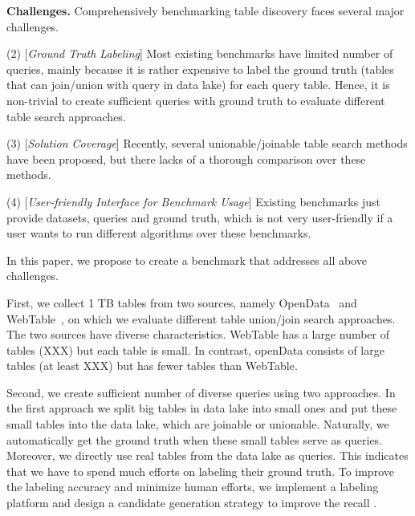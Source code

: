 \noindent \textbf{Challenges.} Comprehensively benchmarking table discovery faces several major challenges.


\noindent (2) [\textit{Ground Truth Labeling}] 
Most existing benchmarks have limited number of queries,  mainly because it is rather expensive to label the ground truth (tables  that can join/union with query in data lake) for each query table. Hence, it is non-trivial to create sufficient queries with ground truth to evaluate different table search approaches.

\noindent (3) [\textit{Solution Coverage}] 
Recently, several unionable/joinable table search methods have been proposed, but there lacks of a thorough comparison over these methods.

\noindent (4) [\textit{User-friendly Interface for Benchmark Usage}] Existing benchmarks just provide datasets, queries and ground truth, which is not very user-friendly if a user wants to
run different algorithms over these benchmarks.

In this paper, we propose to create a benchmark \sys that addresses all above challenges.

First, we collect 1 TB tables from two sources, namely OpenData~\cite{} and  WebTable~\cite{}, on which we evaluate different table union/join search approaches. The two sources have diverse characteristics. WebTable has a large number of tables (XXX) but each table is small. In contrast, openData consists of large tables (at least XXX) but has fewer tables than WebTable. 

Second, we create sufficient number of diverse queries using two approaches. In the first approach we split big tables in data lake into small ones and put these small tables into the data lake, which are joinable or unionable. Naturally, we automatically get the ground truth when these small tables serve as queries. 
Moreover, we directly use real tables from the data lake as queries. This indicates that we have to spend much efforts on labeling their ground truth.
To improve the labeling accuracy and minimize human efforts, we implement a labeling platform and design a candidate generation strategy to improve the recall .   

